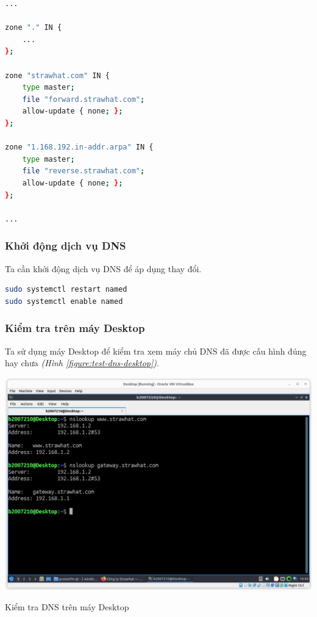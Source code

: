 \documentclass[a4paper, 11pt]{article}
\begin{document}
\begin{lstlisting}[language=bash, caption={Nội dung file /etc/named.conf}]
...

zone "." IN {
    ...
};

zone "strawhat.com" IN {
    type master;
    file "forward.strawhat.com";
    allow-update { none; };
};

zone "1.168.192.in-addr.arpa" IN {
    type master;
    file "reverse.strawhat.com";
    allow-update { none; };
};

...
\end{lstlisting}

\subsubsection{Khởi động dịch vụ DNS}

Ta cần khởi động dịch vụ DNS để áp dụng thay đổi.

\begin{lstlisting}[language=bash, caption={Khởi động dịch vụ DNS}]
sudo systemctl restart named
sudo systemctl enable named
\end{lstlisting}

\subsubsection{Kiểm tra trên máy Desktop}

Ta sử dụng máy Desktop để kiểm tra xem máy chủ DNS đã được cấu hình đúng hay chưa \textit{(Hình \ref{figure:test-dns-desktop})}.

\begin{minipage}
    {\linewidth}
    \captionsetup{type=figure}
    \centering
    \includegraphics[width=\linewidth]{images/test-dns-desktop.png}
    \caption{Kiểm tra DNS trên máy Desktop}
    \label{figure:test-dns-desktop}
\end{minipage}
\end{document}
